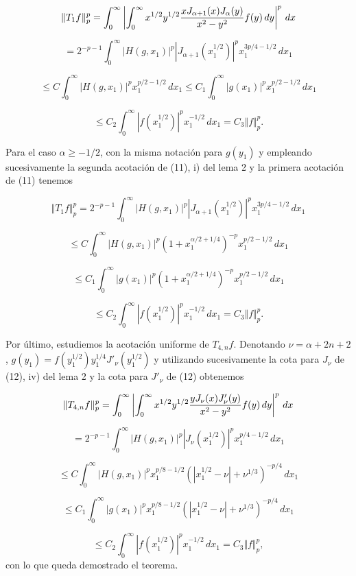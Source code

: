 $$\Vert T_1f \Vert^p_p = \int_0^\infty  {\left| {\int_0^\infty 
{x^{1/2}y^{1/2}{{xJ_{\alpha +1}(x)J_\alpha (y)} \over {x^2-y^2}}f(y)\,dy}}
\right|^p\,dx}$$

$$=2^{-p-1}\int_0^\infty  {\left| {H(g,x_1)} \right|^p\left| {J_{\alpha
+1}(x_1^{1/2})} \right|^px_1^{3p/4-1/2}\,dx_1}$$

$$\le C \int_0^\infty  {\left| {H(g,x_1)} \right|^p x_1^{p/2-1/2}\,dx_1} \le C_1
\int_0^\infty  {\left| {g(x_1)} \right|^p x_1^{p/2-1/2}\,dx_1}$$

$$\le C_2 \int_0^\infty  {\left| {f(x_1^{1/2})} \right|^p x_1^{-1/2}\,dx_1} =
C_3 \Vert f \Vert^p_p. $$

\noindent Para el caso $\alpha \ge -1/2$, con la misma notaci\'on para $g(y_1)$
y empleando sucesivamente la segunda acotaci\'on de (11), i) del lema 2 y la
primera acotaci\'on de (11) tenemos

$$\Vert T_1f \Vert^p_p = 2^{-p-1}\int_0^\infty  {\left| {H(g,x_1)}
\right|^p\left| {J_{\alpha +1}(x_1^{1/2})} \right|^px_1^{3p/4-1/2}\,dx_1}$$

$$\le C \int_0^\infty  {\left| {H(g,x_1)} \right|^p \left( {1+x_1^{\alpha
/2+1/4}} \right)^{-p} x_1^{p/2-1/2}\,dx_1} $$

$$\le C_1 \int_0^\infty  {\left|
{g(x_1)} \right|^p \left( {1+x_1^{\alpha /2+1/4}} \right)^{-p}
x_1^{p/2-1/2}\,dx_1}$$

$$\le C_2 \int_0^\infty  {\left| {f(x_1^{1/2})} \right|^p x_1^{-1/2}\,dx_1} =
C_3 \Vert f \Vert^p_p. $$

\noindent Por \'ultimo, estudiemos la acotaci\'on uniforme de $T_{4,n}f$.
Denotando $\nu=\alpha+2n+2$, $g(y_1)=f(y_1^{1/2})y_1^{1/4}J'_\nu(y_1^{1/2})$ y
utilizando sucesivamente la cota para $J_\nu$ de (12), iv) del lema 2 y la cota
para $J'_\nu$ de (12) obtenemos

$$\Vert T_{4,n}f \Vert^p_p = \int_0^\infty  {\left| {\int_0^\infty 
{x^{1/2}y^{1/2}{{yJ_\nu(x)J'_\nu(y)} \over {x^2-y^2}}f(y)\,dy}}
\right|^p\,dx}$$

$$=2^{-p-1}\int_0^\infty  {\left| {H(g,x_1)} \right|^p\left| {J_\nu(x_1^{1/2})}
\right|^px_1^{p/4-1/2}\,dx_1}$$

$$\le C \int_0^\infty  {\left| {H(g,x_1)} \right|^p x_1^{p/8-1/2}\left(
{|x_1^{1/2}-\nu|+\nu^{1/3}} \right)^{-p/4}\,dx_1} $$

$$\le C_1 \int_0^\infty  {\left| {g(x_1)} \right|^p x_1^{p/8-1/2}\left(
{|x_1^{1/2}-\nu|+\nu^{1/3}} \right)^{-p/4}\,dx_1}$$

$$\le C_2 \int_0^\infty  {\left| {f(x_1^{1/2})} \right|^p x_1^{-1/2}\,dx_1} =
C_3 \Vert f \Vert^p_p, $$
con lo que queda demostrado el teorema.


